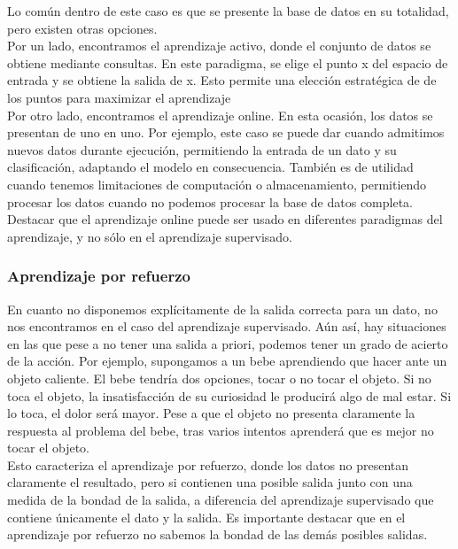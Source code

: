 Lo común dentro de este caso es que se presente la base de datos en su totalidad, pero existen otras opciones.\\

Por un lado, encontramos el aprendizaje activo, donde el conjunto de datos se obtiene mediante consultas. En este paradigma, se elige el punto x del espacio de entrada y se obtiene la salida de x. Esto permite una elección estratégica de de los puntos para maximizar el aprendizaje\\

Por otro lado, encontramos el aprendizaje online. En esta ocasión, los datos se presentan de uno en uno. Por ejemplo, este caso se puede dar cuando admitimos nuevos datos durante ejecución, permitiendo la entrada de un dato y su clasificación, adaptando el modelo en consecuencia. También es de utilidad cuando tenemos limitaciones de computación o almacenamiento, permitiendo procesar los datos cuando no podemos procesar la base de datos completa. Destacar que el aprendizaje online puede ser usado en diferentes paradigmas del aprendizaje, y no sólo en el aprendizaje supervisado.\\

\subsubsection{Aprendizaje por refuerzo}

En cuanto no disponemos explícitamente de la salida correcta para un dato, no nos encontramos en el caso del aprendizaje supervisado. Aún así, hay situaciones en las que pese a no tener una salida a priori, podemos tener un grado de acierto de la acción. Por ejemplo, supongamos a un bebe aprendiendo que hacer ante un objeto caliente. El bebe tendría dos opciones, tocar o no tocar el objeto. Si no toca el objeto, la insatisfacción de su curiosidad le producirá algo de mal estar. Si lo toca, el dolor será mayor. Pese a que el objeto no presenta claramente la respuesta al problema del bebe, tras varios intentos aprenderá que es mejor no tocar el objeto.\\

Esto caracteriza el aprendizaje por refuerzo, donde los datos no presentan claramente el resultado, pero si contienen una posible salida junto con una medida de la bondad de la salida, a diferencia del aprendizaje supervisado que contiene únicamente el dato y la salida. Es importante destacar que en el aprendizaje por refuerzo no sabemos la bondad de las demás posibles salidas.\\

